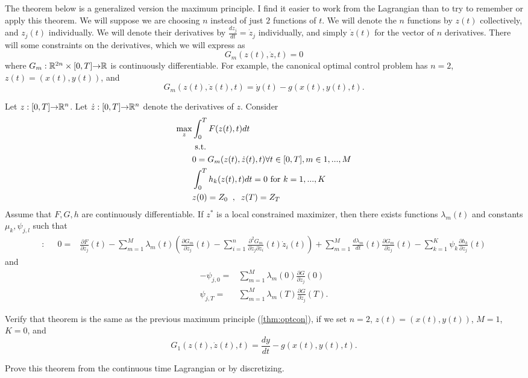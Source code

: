 The theorem below is a generalized version the maximum principle. I
find it easier to work from the Lagrangian than to try to remember or
apply this theorem. We will suppose we are choosing $n$ instead of
just $2$ functions of $t$. We will denote the $n$ functions by $z(t)$
collectively, and $z_j(t)$ individually. We will denote
their derivatives by $\frac{dz_j}{dt} = \dot{z}_j$ individually, and
simply $\dot{z}(t)$ for the vector of $n$ derivatives. There will some
constraints on the derivatives, which we will express as 
\[ G_m(z(t),\dot{z},t) = 0 \]
where $G_m : \mathbb{R}^{2n} \times [0,T] {\rightarrow} \mathbb{R}$ is continuously
differentiable. For example, the canonical optimal control problem has
$n=2$, $z(t) = (x(t),y(t))$, and 
\[ G_m(z(t),\dot{z}(t),t) = \dot{y}(t)
- g(x(t),y(t),t). \]
\begin{theorem}\label{thm:gen}
  Let $z: [0,T] {\rightarrow} \mathbb{R}^n$. Let $\dot{z}: [0,T] {\rightarrow} \mathbb{R}^n$ denote the
  derivatives of $z$.  Consider
  \begin{align}
    \max_{z} & \int_0^T F(z(t),t) dt \notag \\
    & \text{ s.t.} \notag \\
    &  0 = G_m(z(t), \dot{z}(t),t) \forall t \in
    [0,T], m \in 1, ..., M  \label{con:dt} \\ 
    & \int_0^T h_k(z(t),t) dt = 0 \text{ for } k =1, ...,
    K \label{con:int} \\ 
    & z(0) = Z_0 \;\;,\;\; z(T) = Z_T \label{con:ini}
  \end{align}
  Assume that $F,G,h$ are continuously differentiable.  If $z^*$ is a
  local constrained maximizer, then there exists functions
  $\lambda_m(t)$ and constants $\mu_k, \psi_{j,l}$ such that
  \begin{align*}
    [z_j]: && 0 = & \frac{\partial F}{\partial z_j}(t) - \sum_{m=1}^M
    \lambda_m(t) \left(\frac{\partial G_m}{\partial z_j}(t) -
      \sum_{i=1}^n \frac{\partial^2 G_m}{\partial \dot{z}_j \partial
        z_i}(t) \dot{z}_{i}(t) \right) + \sum_{m=1}^M
    \frac{d\lambda_m}{dt}(t) \frac{\partial G_m}{\partial
      \dot{z}_j}(t)
    - \sum_{k=1}^K \psi_k \frac{\partial h_k}{\partial z_j}(t)
  \end{align*}
  and 
  \begin{align*}
    -\psi_{j,0} = & \sum_{m=1}^M \lambda_m(0) \frac{\partial
      G}{\partial \dot{z}_j}(0) \\
    \psi_{j,T} = & \sum_{m=1}^M \lambda_m(T) \frac{\partial
      G}{\partial \dot{z}_j}(T).
  \end{align*}
\end{theorem}
\begin{exercise}
  Verify that theorem is the same as the previous maximum principle
  (\ref{thm:optcon}), if we set $n=2$, $z(t) = (x(t),y(t))$, $M=1$,
  $K=0$, and
  \[ G_1(z(t),\dot{z}(t),t) = \frac{dy}{dt} - g(x(t),y(t),t). \] 
\end{exercise}
\begin{exercise}
  [Difficult] Prove this theorem from the continuous time Lagrangian
  or by discretizing.
\end{exercise}

\clearpage





